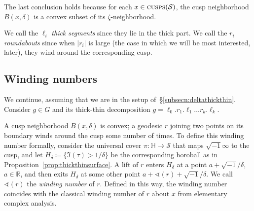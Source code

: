 \documentclass{amsart}
\newcommand\IH{{\mathbb{H}}}
\newcommand\R{{\mathbb{R}}}
\theoremstyle{definition}
\theoremstyle{remark}
\newcommand{\cS}{\mathcal{S}}
\newcommand{\cusps}[1]{\text{\sc cusps}(#1)}
\begin{document}
The last conclusion holds because for each $x\in \cusps{\cS}$, the cusp neighborhood $B(x,\delta)$ is a convex subset of its $\zeta$-neighborhood. 

We call the $\ell_i$ \emph{thick segments} since they lie in the thick part.  We call the $r_i$ \emph{roundabouts} since when $|r_i|$ is large (the case in which we will be most interested, later), they wind around the corresponding cusp.  

\subsection{Winding numbers}\label{subsecn:windingnumbers}
We continue, assuming that we are in the setup of~\S\ref{subsecn:deltathickthin}.  Consider $g\in G$ and its thick-thin decomposition $g=\ell_0.r_1.\ell_1\ldots r_k.\ell_k$.

A cusp neighborhood $B(x,\delta)$ is convex; a geodesic $r$ joining two points on its boundary winds around the cusp some number of times.  To define this winding number formally, consider the universal cover $\pi\colon \IH\to\cS$ that maps $\sqrt{-1}\infty$ to the cusp, and let $H_\delta\coloneqq\{\Im(\tau)>1/\delta\}$ be the corresponding horoball as in Proposition~\ref{prop:thickthinsurface}. A lift of $r$ enters $H_\delta$ at a point $a+\sqrt{-1}/\delta$, $a\in \R$, and then exits $H_\delta$ at some other point $a+\sphericalangle(r)+\sqrt{-1}/\delta$.  We call $\sphericalangle(r)$ the \emph{winding number} of $r$.  Defined in this way, the winding number coincides with the classical winding number of $r$ about $x$ from elementary complex analysis.
\end{document}
